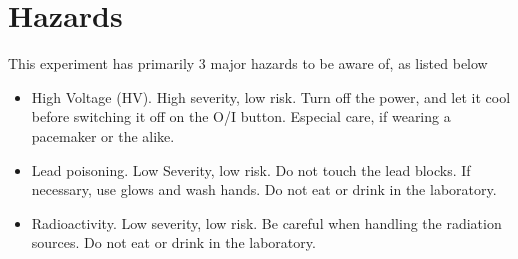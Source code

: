 \section{Hazards}
This experiment has primarily $3$ major hazards to be aware of, as listed below

\begin{itemize}
    \item High Voltage (HV). High severity, low risk. Turn off the power, and
        let it cool before switching it off on the O/I button. Especial care,
        if wearing a pacemaker or the alike.
    \item Lead poisoning. Low Severity, low risk. Do not touch the lead blocks.
        If necessary, use glows and wash hands. Do not eat or drink in the
        laboratory.
    \item Radioactivity. Low severity, low risk. Be careful when handling the
        radiation sources. Do not eat or drink in the laboratory. 
\end{itemize}
